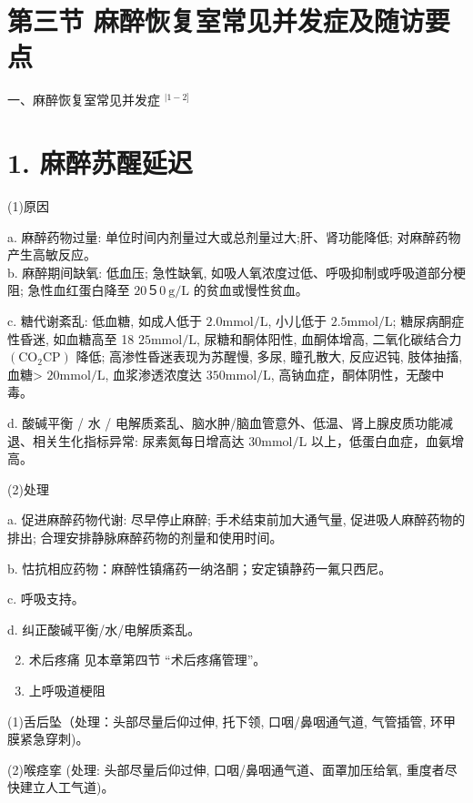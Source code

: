 \documentclass[10pt]{article}
\begin{document}
\section*{第三节 麻醉恢复室常见并发症及随访要点}
一、麻醉恢复室常见并发症 ${ }^{\mid 1-2]}$

\section*{1. 麻醉苏醒延迟}
(1)原因

a. 麻醉药物过量: 单位时间内剂量过大或总剂量过大;肝、肾功能降低; 对麻醉药物产生高敏反应。\\
b. 麻醉期间缺氧: 低血压; 急性缺氧, 如吸人氧浓度过低、呼吸抑制或呼吸道部分梗阻; 急性血红蛋白降至 $20 ５ 0 \mathrm{~g} / \mathrm{L}$ 的贫血或慢性贫血。

c. 糖代谢紊乱: 低血糖, 如成人低于 $2.0 \mathrm{mmol} / \mathrm{L}$, 小儿低于 $2.5 \mathrm{mmol} / \mathrm{L}$; 糖尿病酮症性昏迷, 如血糖高至 18 $25 \mathrm{mmol} / \mathrm{L}$, 尿糖和酮体阳性, 血酮体增高, 二氧化碳结合力 $\left(\mathrm{CO}_{2} \mathrm{CP}\right)$ 降低; 高渗性昏迷表现为苏醒慢, 多尿, 瞳孔散大, 反应迟钝, 肢体抽搐, 血糖> $20 \mathrm{mmol} / \mathrm{L}$, 血浆渗透浓度达 $350 \mathrm{mmol} / \mathrm{L}$, 高钠血症，酮体阴性，无酸中毒。

d. 酸碱平衡 / 水 / 电解质紊乱、脑水肿/脑血管意外、低温、肾上腺皮质功能减退、相关生化指标异常: 尿素氮每日增高达 $30 \mathrm{mmol} / \mathrm{L}$ 以上，低蛋白血症，血氨增高。

(2)处理

a. 促进麻醉药物代谢: 尽早停止麻醉; 手术结束前加大通气量, 促进吸人麻醉药物的排出; 合理安排静脉麻醉药物的剂量和使用时间。

b. 怙抗相应药物：麻醉性镇痛药一纳洛酮；安定镇静药一氟只西尼。

c. 呼吸支持。

d. 纠正酸碱平衡/水/电解质紊乱。

\begin{enumerate}
  \setcounter{enumi}{1}
  \item 术后疼痛 见本章第四节 “术后疼痛管理”。

  \item 上呼吸道梗阻

\end{enumerate}

(1)舌后坠（处理：头部尽量后仰过伸, 托下领, 口咽/鼻咽通气道, 气管插管, 环甲膜紧急穿刺)。

(2)喉痉挛 (处理: 头部尽量后仰过伸, 口咽/鼻咽通气道、面罩加压给氧, 重度者尽快建立人工气道)。
\end{document}
